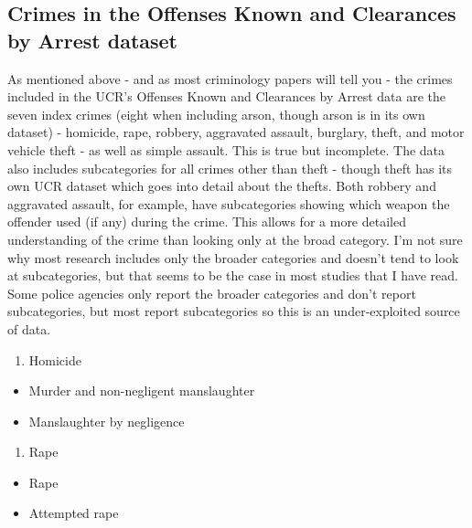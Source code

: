 \documentclass[
  12pt,
  openany]{book}
\providecommand{\tightlist}{%
  \setlength{\itemsep}{0pt}\setlength{\parskip}{0pt}}
\begin{document}
\hypertarget{crimes-in-the-offenses-known-and-clearances-by-arrest-dataset}{%
\subsection{Crimes in the Offenses Known and Clearances by Arrest dataset}\label{crimes-in-the-offenses-known-and-clearances-by-arrest-dataset}}

As mentioned above - and as most criminology papers will tell you - the crimes included in the UCR's Offenses Known and Clearances by Arrest data are the seven index crimes (eight when including arson, though arson is in its own dataset) - homicide, rape, robbery, aggravated assault, burglary, theft, and motor vehicle theft - as well as simple assault. This is true but incomplete. The data also includes subcategories for all crimes other than theft - though theft has its own UCR dataset which goes into detail about the thefts. Both robbery and aggravated assault, for example, have subcategories showing which weapon the offender used (if any) during the crime. This allows for a more detailed understanding of the crime than looking only at the broad category. I'm not sure why most research includes only the broader categories and doesn't tend to look at subcategories, but that seems to be the case in most studies that I have read. Some police agencies only report the broader categories and don't report subcategories, but most report subcategories so this is an under-exploited source of data.

\begin{enumerate}
\def\labelenumi{\arabic{enumi}.}
\tightlist
\item
  Homicide\\
\end{enumerate}

\begin{itemize}
\tightlist
\item
  Murder and non-negligent manslaughter\\
\item
  Manslaughter by negligence\\
\end{itemize}

\begin{enumerate}
\def\labelenumi{\arabic{enumi}.}
\setcounter{enumi}{1}
\tightlist
\item
  Rape\\
\end{enumerate}

\begin{itemize}
\tightlist
\item
  Rape\\
\item
  Attempted rape\\
\end{itemize}
\end{document}

